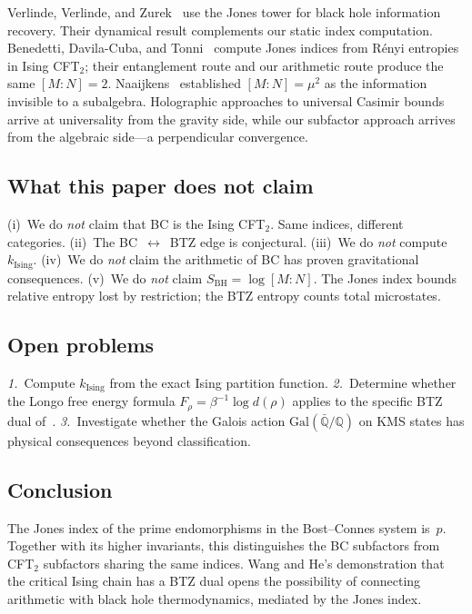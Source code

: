 \documentclass[aps,prl,twocolumn,superscriptaddress,showpacs]{revtex4-2}
\begin{document}
Verlinde, Verlinde, and Zurek~\cite{VerlindeVerlindeZurek2025} use the Jones tower for black hole information recovery. Their dynamical result complements our static index computation. Benedetti, Davila-Cuba, and Tonni~\cite{BenedettiDavilaTonni2026} compute Jones indices from R\'enyi entropies in Ising CFT$_2$; their entanglement route and our arithmetic route produce the same $[M{:}N]=2$. Naaijkens~\cite{Naaijkens2017,FiedlerNaaijkensOsborne2017} established $[M{:}N] = \mu^2$ as the information invisible to a subalgebra. Holographic approaches to universal Casimir bounds~\cite{HolographicCasimir2025} arrive at universality from the gravity side, while our subfactor approach arrives from the algebraic side---a perpendicular convergence.

\subsection{What this paper does not claim}

(i)~We do \textit{not} claim that BC is the Ising CFT$_2$. Same indices, different categories. (ii)~The BC~$\leftrightarrow$~BTZ edge is conjectural. (iii)~We do \textit{not} compute $k_{\mathrm{Ising}}$. (iv)~We do \textit{not} claim the arithmetic of BC has proven gravitational consequences. (v)~We do \textit{not} claim $S_{\mathrm{BH}} = \log[M{:}N]$. The Jones index bounds relative entropy lost by restriction; the BTZ entropy counts total microstates.

\subsection{Open problems}

\textit{1.}~Compute $k_{\mathrm{Ising}}$ from the exact Ising partition function. \textit{2.}~Determine whether the Longo free energy formula $F_\rho = \beta^{-1}\log d(\rho)$ applies to the specific BTZ dual of~\cite{WangHe2026}. \textit{3.}~Investigate whether the Galois action $\mathrm{Gal}(\bar{\mathbb{Q}}/\mathbb{Q})$ on KMS states has physical consequences beyond classification.

\subsection{Conclusion}

The Jones index of the prime endomorphisms in the Bost--Connes system is~$p$. Together with its higher invariants, this distinguishes the BC subfactors from CFT$_2$ subfactors sharing the same indices. Wang and He's demonstration that the critical Ising chain has a BTZ dual opens the possibility of connecting arithmetic with black hole thermodynamics, mediated by the Jones index.
\end{document}
